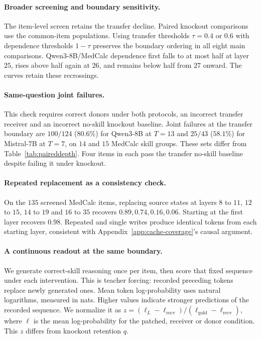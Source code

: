 \paragraph{Broader screening and boundary sensitivity.}
The item-level screen retains the transfer decline. Paired knockout
comparisons use the common-item populations. Using transfer thresholds
$\tau=0.4$ or $0.6$ with dependence thresholds $1-\tau$ preserves the
boundary ordering in all eight main comparisons. Qwen3-8B/MedCalc dependence
first falls to at most half at layer $25$, rises above half again at $26$,
and remains below half from $27$ onward. The curves retain these recrossings.

\paragraph{Same-question joint failures.}
\label{app:joint-failure}
This check requires correct donors under both protocols, an incorrect
transfer receiver and an incorrect no-skill knockout baseline.
Joint failures at the transfer boundary are $100/124$ ($80.6\%$) for
Qwen3-8B at $T=13$ and $25/43$ ($58.1\%$) for Mistral-7B at $T=7$,
on $14$ and $15$ MedCalc skill groups. These sets differ from
Table~\ref{tab:paireddepth}. Four items in each pass the transfer
no-skill baseline despite failing it under knockout.

\paragraph{Repeated replacement as a consistency check.}
\label{app:repeated}
On the $135$ screened MedCalc items, replacing source states at layers
$8$ to $11$, $12$ to $15$, $14$ to $19$ and $16$ to $35$ recovers
$0.89,0.74,0.16,0.06$. Starting at the first layer recovers $0.98$.
Repeated and single writes produce identical tokens from each starting
layer, consistent with Appendix~\ref{app:cache-coverage}'s causal argument.

\paragraph{A continuous readout at the same boundary.}
We generate correct-skill reasoning once per item, then score that fixed
sequence under each intervention. This is teacher forcing: recorded
preceding tokens replace newly generated ones. Mean token log-probability
uses natural logarithms, measured in nats. Higher values indicate stronger
predictions of the recorded sequence. We normalize it as
$z=(\ell_L-\ell_{\mathrm{recv}})/(\ell_{\mathrm{gold}}-\ell_{\mathrm{recv}})$,
where $\ell$ is the mean log-probability for the patched, receiver or
donor condition. This $z$ differs from knockout retention $q$.

